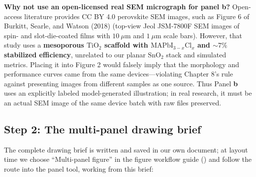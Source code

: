 \begin{BookNote}
\textbf{Why not use an open-licensed real SEM micrograph for panel b?} Open-access literature provides CC BY 4.0 perovskite SEM images, such as Figure 6 of Burkitt, Searle, and Watson (2018) (top-view Jeol JSM-7800F SEM images of spin- and slot-die-coated films with $10\ \mu\text{m}$ and $1\ \mu\text{m}$ scale bars). However, that study uses a \textbf{mesoporous $\text{TiO}_2$ scaffold with $\text{MAPbI}_{3-x}\text{Cl}_x$ and $\sim 7\%$ stabilized efficiency}, unrelated to our planar $\text{SnO}_2$ stack and simulated metrics. Placing it into Figure 2 would falsely imply that the morphology and performance curves came from the same devices---violating Chapter 8's rule against presenting images from different samples as one source. Thus Panel \textbf{b} uses an explicitly labeled model-generated illustration; in real research, it must be an actual SEM image of the same device batch with raw files preserved.
\end{BookNote}

\subsection*{Step 2: The multi-panel drawing brief}

The complete drawing brief is written and saved in our own document; at layout time we choose ``Multi-panel figure'' in the \scidraw{} figure workflow guide () and follow the route into the panel tool, working from this brief:

